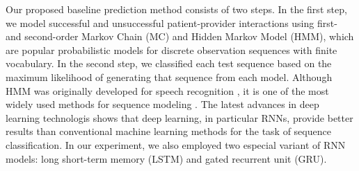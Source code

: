 \documentclass{amia_summit_2018}
\begin{document}
Our proposed baseline prediction method consists of two steps. In the first step, we model successful and unsuccessful patient-provider interactions using first- and second-order Markov Chain (MC) and Hidden Markov Model (HMM), which are popular probabilistic models for discrete observation sequences with finite vocabulary. In the second step, we classified each test sequence based on the maximum likelihood of generating that sequence from each model. Although HMM was originally developed for speech recognition \cite{rabiner1989tutorial}, it is one of the most widely used methods for sequence modeling \cite{mutsam2016maximum, eickeler1998hidden, srivastava2007hmm, won2004training, chai2001folk}. The latest advances in deep learning technologis shows that deep learning, in particular RNNs, provide better results than conventional machine learning methods for the task of sequence classification. In our experiment, we also employed two especial variant of RNN models: long short-term memory (LSTM) and gated recurrent unit (GRU).
\end{document}
